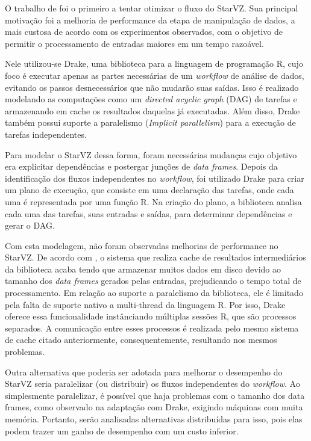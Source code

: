 O trabalho de \citet{ref:drakestarvz} foi o primeiro a tentar otimizar o fluxo do StarVZ. 
Sua principal motivação foi a melhoria de performance da etapa de manipulação de dados, a mais
custosa de acordo com os experimentos observados, com o objetivo de permitir o processamento de 
entradas maiores em um tempo razoável.

Nele utilizou-se Drake, uma biblioteca para a linguagem de programação R, cujo foco é executar apenas as 
partes necessárias de um \emph{workflow} de análise de dados, evitando os passos desnecessários que não mudarão
suas saídas. Isso é realizado modelando as computações como um \emph{directed acyclic graph} (DAG) de tarefas e 
armazenando em cache os resultados daquelas já executadas. Além disso, Drake também possui suporte a paralelismo
(\emph{Implicit parallelism}) para a execução de tarefas independentes.

Para modelar o StarVZ dessa forma, foram necessárias mudanças cujo objetivo era explicitar 
dependências e postergar junções de \emph{data frames}. Depois da identificação dos fluxos independentes    
no \emph{workflow}, foi utilizado Drake para criar um plano de execução, que consiste em uma declaração
das tarefas, onde cada uma é representada por uma função R. Na criação do plano, a biblioteca analisa cada
uma das tarefas, suas entradas e saídas, para determinar dependências e gerar o DAG.

Com esta modelagem, não foram observadas melhorias de performance no StarVZ. De acordo com \citet{ref:drakestarvz},
o sistema que realiza cache de resultados intermediários da biblioteca acaba tendo que armazenar muitos dados em disco devido
ao tamanho dos \emph{data frames} gerados pelas entradas, prejudicando o tempo total de processamento.
Em relação ao suporte a paralelismo da biblioteca, ele é limitado pela falta de suporte nativo a multi-thread da linguagem R.
Por isso, Drake oferece essa funcionalidade instânciando múltiplas sessões R, que são processos separados. A comunicação
entre esses processos é realizada pelo mesmo sistema de cache citado anteriormente, consequentemente, resultando nos mesmos
problemas.

Outra alternativa que poderia ser adotada para melhorar o desempenho do StarVZ seria paralelizar (ou distribuir) 
os fluxos independentes do \emph{workflow}. Ao simplesmente paralelizar, é possível que haja problemas com o tamanho dos
data frames, como observado na adaptação com Drake, exigindo máquinas com muita memória. Portanto, serão analisadas alternativas
distribuídas para isso, pois elas podem trazer um ganho de desempenho com um custo inferior.

